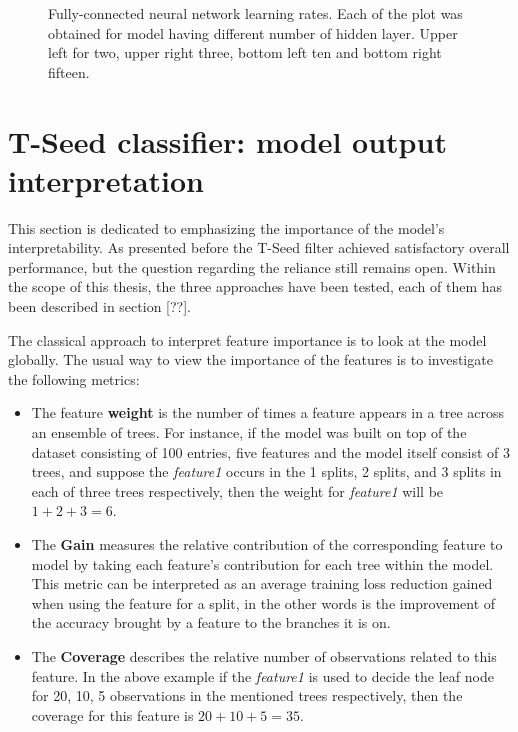 \begin{figure}[!htb]
\begin{tabular}{c c}
\end{tabular}
   \caption{Fully-connected neural network learning rates.  Each of the plot was obtained for model having different number of hidden layer. Upper left for two, upper right three, bottom left ten and  bottom right fifteen.  
\label{fig:DNN_learning_rates}}  
\end{figure}





\section{T-Seed classifier: model output interpretation}

This section is dedicated to emphasizing the importance of the model's interpretability. As presented before the T-Seed filter achieved satisfactory overall performance, but the question regarding the reliance still remains open.
Within the scope of this thesis, the three approaches have been tested, each of them has been described in section [??]. 

The classical approach to interpret feature importance is to look at the model globally. The  usual way to view the importance of the features is to investigate the following metrics: 

\begin{itemize}
    \item The feature \textbf{weight} is the number of times a feature appears in a tree across an ensemble of trees. For instance, if the model was built on top of the dataset consisting  of 100 entries, five features and the model itself consist of 3 trees, and suppose the \textit{feature1} occurs in the 1 splits, 2 splits, and 3 splits in each of three trees respectively, then the weight for \textit{feature1} will be $1+2+3=6$.   
    \item The \textbf{Gain} measures the relative contribution of the corresponding feature to model by taking each feature's contribution for each tree within the model. This metric can be interpreted as an average training loss reduction gained when using the feature for a split, in the other words is the improvement of the accuracy brought by a feature to the branches it is on. 
    \item The \textbf{Coverage} describes the relative number of observations related to this feature. In the above example if the \textit{feature1} is used to decide the leaf node for 20, 10, 5 observations in the mentioned trees respectively, then the coverage for this feature is $20+10+5 = 35$.   
\end{itemize}


